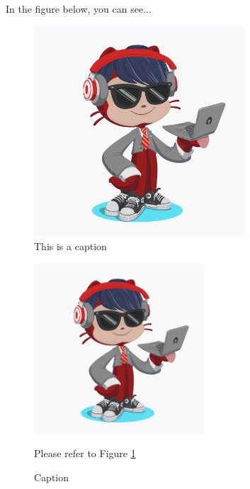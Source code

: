 \documentclass{article}
\begin{document}
\blindtext

In the figure below, you can see...

\begin{figure}[H]
\centering
\includegraphics[width=0.7\textwidth]{octocat.png}
\caption{This is a caption}
\end{figure}

\blindtext

\begin{figure}
\centering
\includegraphics[width=2.5in]{octocat.png}
\caption{Caption\label{latexpic}}

Please refer to Figure \ref{latexpic}
\end{figure}


\blindtext
\end{document}
